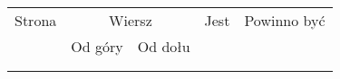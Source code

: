 \documentclass[a4paper,11pt]{article}
\numberwithin{equation}{section}
\renewcommand{\lambda}{\uplambda}
\begin{document}
{\begin{center}
  \begin{tabular}{|c|c|c|c|c|}
    \hline
    Strona & \multicolumn{2}{c|}{Wiersz} & Jest
                              & Powinno być \\ \cline{2-3}
    & Od góry & Od dołu & & \\
    \hline
           & & & & \\
           & & & & \\
    \hline
  \end{tabular}


\end{center}}
\end{document}
